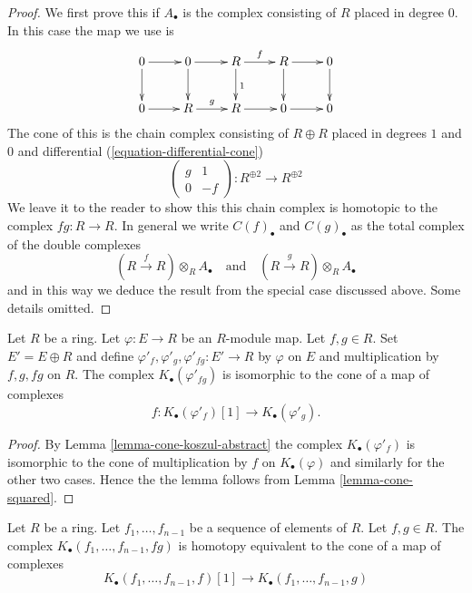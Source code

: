 \begin{proof}
We first prove this if $A_\bullet$ is the complex consisting of $R$ placed
in degree $0$. In this case the map we use is
$$
\xymatrix{
0 \ar[r] \ar[d] &
0 \ar[r] \ar[d] &
R \ar[r]^f \ar[d]^1 &
R \ar[r] \ar[d] & 0 \ar[d] \\
0 \ar[r] & R \ar[r]^g & R \ar[r] & 0 \ar[r] & 0
}
$$
The cone of this is the chain complex consisting of $R \oplus R$ placed in
degrees $1$ and $0$ and differential (\ref{equation-differential-cone})
$$
\left(
\begin{matrix}
g & 1 \\
0 & -f
\end{matrix}
\right) :
R^{\oplus 2} \longrightarrow R^{\oplus 2}
$$
We leave it to the reader to show this this chain complex is
homotopic to the complex $fg : R \to R$. In general we
write $C(f)_\bullet$ and $C(g)_\bullet$
as the total complex of the double complexes
$$
(R \xrightarrow{f} R) \otimes_R A_\bullet
\quad\text{and}\quad
(R \xrightarrow{g} R) \otimes_R A_\bullet
$$
and in this way we deduce the result from the special case discussed above.
Some details omitted.
\end{proof}

\begin{lemma}
\label{lemma-koszul-mult-abstract}
Let $R$ be a ring. Let $\varphi : E \to R$ be an $R$-module map.
Let $f, g \in R$. Set $E' = E \oplus R$ and define
$\varphi'_f, \varphi'_g, \varphi'_{fg} : E' \to R$
by $\varphi$ on $E$ and multiplication by $f, g, fg$ on $R$.
The complex $K_\bullet(\varphi'_{fg})$ is isomorphic to the
cone of a map of complexes
$$
f :
K_\bullet(\varphi'_f)[1]
\longrightarrow
K_\bullet(\varphi'_g).
$$
\end{lemma}

\begin{proof}
By
Lemma \ref{lemma-cone-koszul-abstract}
the complex $K_\bullet(\varphi'_f)$ is isomorphic to the cone of
multiplication by $f$ on $K_\bullet(\varphi)$ and similarly
for the other two cases. Hence the the lemma follows from
Lemma \ref{lemma-cone-squared}.
\end{proof}

\begin{lemma}
\label{lemma-koszul-mult}
Let $R$ be a ring. Let $f_1, \ldots, f_{n - 1}$ be a sequence of elements
of $R$. Let $f, g \in R$. The complex
$K_\bullet(f_1, \ldots, f_{n - 1}, fg)$
is homotopy equivalent to the cone of a map of complexes
$$
K_\bullet(f_1, \ldots, f_{n - 1}, f)[1]
\longrightarrow
K_\bullet(f_1, \ldots, f_{n - 1}, g)
$$
\end{lemma}

